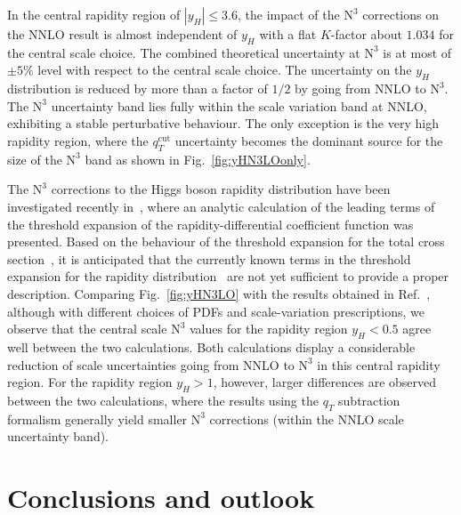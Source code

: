 \documentclass[12pt]{article}
\DeclareRobustCommand{\qt}{\ensuremath{q_T}\xspace}
\DeclareRobustCommand{\qtcut}{\ensuremath{q_T^\mathrm{cut}}\xspace}
\DeclareRobustCommand{\LO}{\text{LO}\xspace}
\DeclareRobustCommand{\N}[1]{\ensuremath{\text{N}^{#1}}} %
\begin{document}
In the central rapidity region of $|y_{H}| \leq 3.6$, the impact of the \N3\LO corrections on the NNLO result is almost independent of $y_{H}$ with a flat $K$-factor about $1.034$ for the central scale choice. The combined theoretical uncertainty at \N3\LO is at most of $\pm 5 \%$ level with respect to the central scale choice. The uncertainty on the $y_H$ distribution is reduced by more than a factor of $1/2$ by going from NNLO to \N3\LO. The \N3\LO uncertainty band lies fully within the scale variation band at NNLO, exhibiting a stable perturbative behaviour. 
The only exception is the very high rapidity region, where the $\qtcut$ uncertainty becomes the dominant source for the size of the \N3\LO band as shown in Fig.~\ref{fig:yHN3LOonly}.

The \N3\LO corrections to the Higgs boson rapidity distribution have been investigated recently in~\cite{Dulat:2017prg},
where an analytic calculation of the leading terms of the threshold expansion of the  rapidity-differential coefficient function 
was presented. Based on the behaviour of the threshold expansion for the total cross section~\cite{Anastasiou:2015ema}, 
it is anticipated that the currently known terms in the threshold expansion for the rapidity distribution~\cite{Dulat:2017prg} are not yet sufficient to provide a proper description.  
Comparing Fig.~\ref{fig:yHN3LO} with the results obtained in Ref.~\cite{Dulat:2017prg}, although with different choices of PDFs and scale-variation prescriptions, we observe that the central scale \N3\LO values for the rapidity region $y_H < 0.5$ agree well between the two calculations. Both calculations display a considerable reduction of scale uncertainties going from NNLO to \N3\LO in this central rapidity region. 
For the rapidity region $y_H > 1$, however, larger differences are observed between the two calculations, where the results using the $\qt$ subtraction formalism generally yield smaller \N3\LO corrections 
(within the NNLO scale uncertainty band).


\section{Conclusions and outlook}
\label{Sec:conclu}
\end{document}
